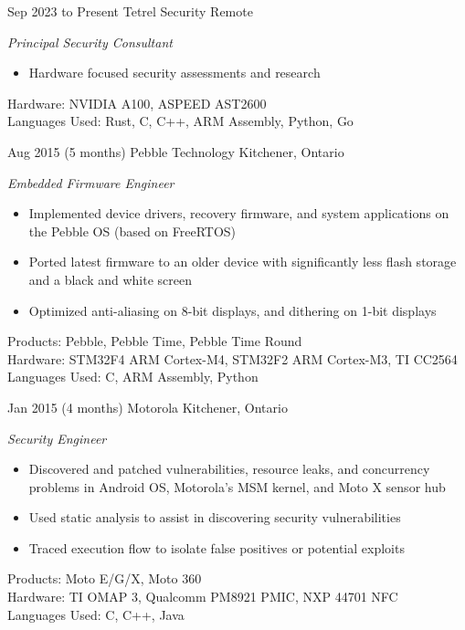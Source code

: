 \documentclass[print]{friggeri-cv} %
\begin{document}
\begin{entrylist}

\entry
{Sep 2023}
{to Present}
{Tetrel Security}
{Remote}
{\emph{Principal Security Consultant}
\begin{itemize}
\item Hardware focused security assessments and research
\end{itemize}
Hardware: NVIDIA A100, ASPEED AST2600 \\
Languages Used: Rust, C, C++, ARM Assembly, Python, Go \\
}

\entry
{Aug 2015}
{(5 months)}
{Pebble Technology}
{Kitchener, Ontario}
{\emph{Embedded Firmware Engineer}
\begin{itemize}
\item Implemented device drivers, recovery firmware, and system applications on the Pebble OS (based on FreeRTOS)
\item Ported latest firmware to an older device with significantly less flash storage and a black and white screen
\item Optimized anti-aliasing on 8-bit displays, and dithering on 1-bit displays
\end{itemize}
Products: Pebble, Pebble Time, Pebble Time Round \\
Hardware: STM32F4 ARM Cortex-M4, STM32F2 ARM Cortex-M3, TI CC2564 \\
Languages Used: C, ARM Assembly, Python \\
}

\entry
{Jan 2015}
{(4 months)}
{Motorola}
{Kitchener, Ontario}
{\emph{Security Engineer}
\begin{itemize}
\item Discovered and patched vulnerabilities, resource leaks, and concurrency problems in Android OS, Motorola's MSM kernel, and Moto X sensor hub
\item Used static analysis to assist in discovering security vulnerabilities
\item Traced execution flow to isolate false positives or potential exploits
\end{itemize}
Products: Moto E/G/X, Moto 360 \\
Hardware: TI OMAP 3, Qualcomm PM8921 PMIC, NXP 44701 NFC \\
Languages Used: C, C++, Java \\
}


\end{entrylist}
\end{document}
